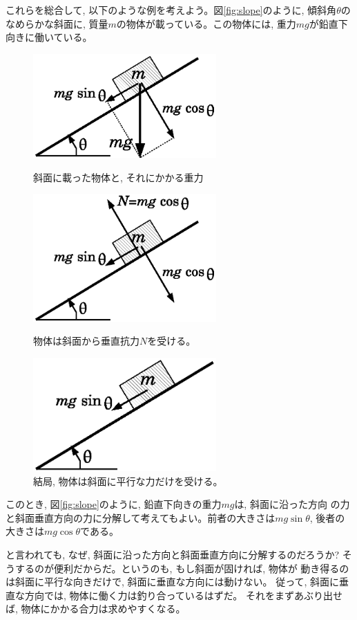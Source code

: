 これらを総合して, 以下のような例を考えよう。図\ref{fig:slope}のように, 
傾斜角$\theta$のなめらかな斜面に, 質量$m$の物体が載っている。この物体には, 
重力$mg$が鉛直下向きに働いている。
\begin{figure}[h]
    \centering
    \includegraphics[width=7cm]{slope.eps}
    \caption{斜面に載った物体と, それにかかる重力}\label{fig:slope}

    \centering
    \includegraphics[width=7cm]{slope2.eps}
    \caption{物体は斜面から垂直抗力$N$を受ける。}\label{fig:slope2}

    \centering
    \includegraphics[width=7cm]{slope3.eps}
    \caption{結局, 物体は斜面に平行な力だけを受ける。}\label{fig:slope3}
\end{figure}

このとき, 図\ref{fig:slope}のように, 鉛直下向きの重力$mg$は, 斜面に沿った方向
の力と斜面垂直方向の力に分解して考えてもよい。前者の大きさは$mg\sin\theta$, 
後者の大きさは$mg\cos\theta$である。

と言われても, なぜ, 斜面に沿った方向と斜面垂直方向に分解するのだろうか?
そうするのが便利だからだ。というのも, もし斜面が固ければ, 物体が
動き得るのは斜面に平行な向きだけで, 斜面に垂直な方向には動けない。
従って, 斜面に垂直な方向では, 物体に働く力は釣り合っているはずだ。
それをまずあぶり出せば, 物体にかかる合力は求めやすくなる。


